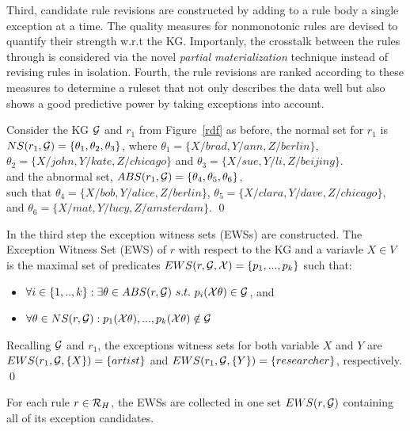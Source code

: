 Third, candidate rule revisions are constructed by adding to a rule body a single exception at a time. The quality measures for nonmonotonic rules are devised to quantify their strength w.r.t the KG. Importanly, the crosstalk between the rules through is considered via the novel \emph{partial materialization} technique instead of revising rules in isolation. Fourth, the rule revisions are ranked according to these measures to determine a ruleset that not only describes the data well but also shows a good predictive power by taking exceptions into account. 



\begin{example}
Consider the KG $\mathcal{G}$ and $r_1$ from Figure~\ref{rdf} as before, the normal set for $r_1$ is $NS(r_1,\mathcal{G})=\{\theta_1, \theta_2 ,\theta_3\}$, where $\theta_1 = \{X/brad, Y/ann, Z/berlin\}$,\\  $\theta_2 = \{X/john, Y/kate, Z/chicago\}$ and $\theta_3 = \{X/sue, Y/li, Z/beijing\}$.\\ and the abnormal set, $ABS(r_1,\mathcal{G})=\{\theta_4,\theta_5, \theta_6\}$, \\such that $\theta_4=\{X/bob, Y/alice, Z/berlin\}$,  $\theta_5=\{X/clara, Y/dave, Z/chicago\}$, and $\theta_6=\{X/mat, Y/lucy, Z/amsterdam\}$.
\qed
\end{example}



In the third step the exception witness sets (EWSs) are constructed. The Exception Witness Set (EWS) of $r$ with respect to the KG and a variavle $X\in V$ is the maximal set of predicates $EWS(r,\mathcal{G},\mathcal{X}) = \{p_1,...,p_k\}$ such that:
\begin{itemize}
\item $\forall i \in \{1,..,k\} : \exists \theta \in ABS(r, \mathcal{G})\ s.t.\ p_i(\mathcal{X}\theta) \in \mathcal{G}$, and 
\item $\forall \theta \in NS(r,\mathcal{G}) :  p_1(\mathcal{X}\theta), ...,p_k(\mathcal{X}\theta) \notin \mathcal{G}$
\end{itemize}

\begin{example}
Recalling $\mathcal{G}$ and $r_1$, the exceptions witness sets for both variable $X$ and $Y$ are $EWS(r_1,\mathcal{G},\{X\}) = \{artist\}$ and $EWS(r_1,\mathcal{G},\{Y\}) = \{researcher\}$, respectively.
\qed
\end{example}
For each rule $r \in \mathcal{R}_H$, the EWSs are collected in one set $EWS(r,\mathcal{G})$ containing all of its exception candidates. 

